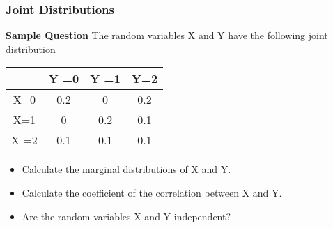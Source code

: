 \documentclass{beamer}
\begin{document}
\begin{frame}
\frametitle{Joint Distributions}

\textbf{Sample Question}
The random variables X and Y have the following joint distribution


\begin{tabular}{|c|c|c|c|}
  \hline

   & Y =0 & Y =1 & Y=2 \\
  \hline
  X=0 & 0.2 & 0 & 0.2 \\
  X=1 & 0 & 0.2 & 0.1 \\
  X
  =2 & 0.1 & 0.1 & 0.1 \\
  \hline
\end{tabular}
\end{frame}
\begin{frame}

\begin{itemize}
\item Calculate the marginal distributions of X and Y. \item
Calculate the coefficient of the correlation between X and Y.
\item Are the random variables X and Y independent?
\end{itemize}
\end{frame}
\end{document}
